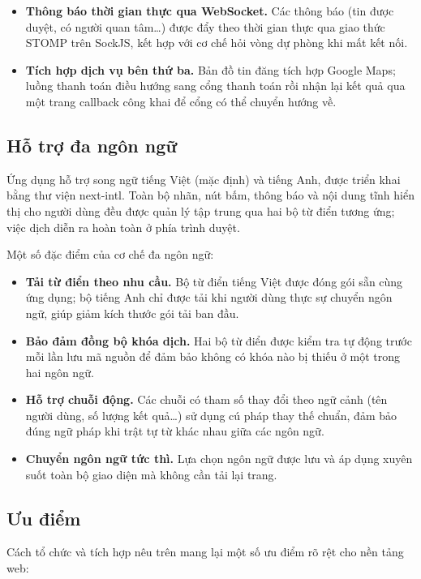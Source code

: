 \begin{itemize}
\item \textbf{Thông báo thời gian thực qua WebSocket.} Các thông báo (tin được duyệt, có người quan tâm\ldots) được đẩy theo thời gian thực qua giao thức STOMP trên SockJS, kết hợp với cơ chế hỏi vòng dự phòng khi mất kết nối.

\item \textbf{Tích hợp dịch vụ bên thứ ba.} Bản đồ tin đăng tích hợp Google Maps; luồng thanh toán điều hướng sang cổng thanh toán rồi nhận lại kết quả qua một trang callback công khai để cổng có thể chuyển hướng về.
\end{itemize}

\FloatBarrier
\subsection{Hỗ trợ đa ngôn ngữ}

Ứng dụng hỗ trợ song ngữ tiếng Việt (mặc định) và tiếng Anh, được triển khai bằng thư viện next-intl. Toàn bộ nhãn, nút bấm, thông báo và nội dung tĩnh hiển thị cho người dùng đều được quản lý tập trung qua hai bộ từ điển tương ứng; việc dịch diễn ra hoàn toàn ở phía trình duyệt.

Một số đặc điểm của cơ chế đa ngôn ngữ:

\begin{itemize}
\item \textbf{Tải từ điển theo nhu cầu.} Bộ từ điển tiếng Việt được đóng gói sẵn cùng ứng dụng; bộ tiếng Anh chỉ được tải khi người dùng thực sự chuyển ngôn ngữ, giúp giảm kích thước gói tải ban đầu.
\item \textbf{Bảo đảm đồng bộ khóa dịch.} Hai bộ từ điển được kiểm tra tự động trước mỗi lần lưu mã nguồn để đảm bảo không có khóa nào bị thiếu ở một trong hai ngôn ngữ.
\item \textbf{Hỗ trợ chuỗi động.} Các chuỗi có tham số thay đổi theo ngữ cảnh (tên người dùng, số lượng kết quả\ldots) sử dụng cú pháp thay thế chuẩn, đảm bảo đúng ngữ pháp khi trật tự từ khác nhau giữa các ngôn ngữ.
\item \textbf{Chuyển ngôn ngữ tức thì.} Lựa chọn ngôn ngữ được lưu và áp dụng xuyên suốt toàn bộ giao diện mà không cần tải lại trang.
\end{itemize}


\FloatBarrier
\subsection{Ưu điểm}

Cách tổ chức và tích hợp nêu trên mang lại một số ưu điểm rõ rệt cho nền tảng web:

